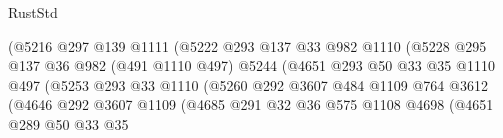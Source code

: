 \begin{lexlean}{RustStd}
\begin{coremodule}
                                    (@5216
                                      @297
                                      @139
                                      @1111
                                      (@5222
                                        @293
                                        @137
                                        @33
                                        @982
                                        @1110
                                        (@5228
                                          @295
                                          @137
                                          @36
                                          @982
                                          (@491 @1110 @497)
                                          @5244
                                          (@4651
                                            @293
                                            @50
                                            @33
                                            @35
                                            @1110
                                            @497
                                            (@5253
                                              @293
                                              @33
                                              @1110
                                              (@5260
                                                @292
                                                @3607
                                                @484
                                                @1109
                                                @764
                                                @3612
                                                (@4646
                                                  @292
                                                  @3607
                                                  @1109
                                                  (@4685
                                                    @291
                                                    @32
                                                    @36
                                                    @575
                                                    @1108
                                                    @4698
                                                    (@4651
                                                      @289
                                                      @50
                                                      @33
                                                      @35

\end{coremodule}
\end{lexlean}
